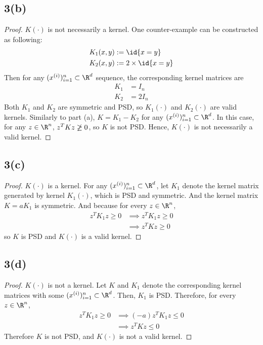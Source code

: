 \documentclass[11pt]{article}
\newcommand{\upi}[0]{^{(i)}}
\begin{document}
	\subsection{3(b)}
	\begin{proof}
		$K(\cdot)$ is not necessarily a kernel. One counter-example can be constructed as following:
		\begin{align}
			K_1(x, y) &:= \id{x = y} \\
			K_2(x, y) &:= 2 \times \id{x = y}
		\end{align}
		Then for any $(x\upi)_{i=1}^n \subset \R^d$ sequence, the corresponding kernel matrices are
		\begin{align}
			K_1 &= I_n \\
			K_2 &= 2 I_n
		\end{align}
		Both $K_1$ and $K_2$ are symmetric and PSD, so $K_1(\cdot)$ and $K_2(\cdot)$ are valid kernels. Similarly to part (a), $K = K_1 - K_2$ for any $(x\upi)_{i=1}^n \subset \R^d$. In this case, for any $z \in \R^n$, $z^T K z \centernot{\geq} 0 $, so $K$ is not PSD. Hence, $K(\cdot)$ is not necessarily a valid kernel.
	\end{proof}
	
	\newpage
	\subsection{3(c)}
	\begin{proof}
		$K(\cdot)$ is a kernel. For any $(x\upi)_{i=1}^n \subset \R^d$, let $K_1$ denote the kernel matrix generated by kernel $K_1(\cdot)$, which is PSD and symmetric. And the kernel matrix $K = a K_1$ is symmetric. And because for every $z \in \R^n$, 
		\begin{align}
			z^T K_1 z \geq 0 &\implies z^T K_1 z \geq 0 \\
			&\implies z^T K z \geq 0
		\end{align}
		so $K$ is PSD and $K(\cdot)$ is a valid kernel.
	\end{proof}
	
	\newpage
	\subsection{3(d)}
	\begin{proof}
		$K(\cdot)$ is not a kernel. Let $K$ and $K_1$ denote the corresponding kernel matrices with some $(x\upi)_{i=1}^n \subset \R^d$. Then, $K_1$ is PSD. Therefore, for every $z \in \R^n$,
		\begin{align}
			z^T K_1 z \geq 0 &\implies (-a)z^T K_1 z \leq 0 \\
			&\implies z^T K z \leq 0
		\end{align}
		Therefore $K$ is not PSD, and $K(\cdot)$ is not a valid kernel.
	\end{proof}
	
\end{document}
